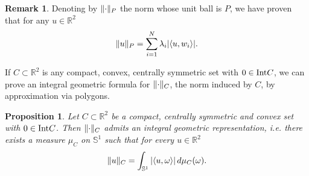 \documentclass{article}
\numberwithin{equation}{section}
\theoremstyle{plain}%
\newtheorem{proposition}[theorem]{Proposition}
\theoremstyle{definition}
\newtheorem{rem}[theorem]{Remark}
\theoremstyle{definition}
\newcommand{\rgrande}{\mathbb{R}}
\newcommand{\sfera}{\mathbb{S}}
\newcommand{\interno}{{\rm Int}}
\DeclarePairedDelimiter{\norma}{\lVert}{\rVert} %
\DeclarePairedDelimiter{\valass}{\lvert}{\rvert} %
\newcommand{\prodscal}[2]{\langle{#1} , {#2} \rangle}
\begin{document}
\begin{rem}
    Denoting by $\norma{\cdot}_P$ the norm whose unit ball is $P$, we have proven that for any $u \in \rgrande^2$
    $$
    \norma{u}_P
    =
    \sum_{i = 1}^{N} \lambda_i \valass{\prodscal{u}{w_i}}
    \text{.}
    $$
\end{rem}
If $C \subset \rgrande^2$ is any compact, convex, centrally symmetric set with $0\in\interno C$, we can prove an integral geometric formula for $\norma{\cdot}_C$, the norm induced by $C$, by approximation via polygons.
\begin{proposition}\label{propignelpiano}
Let $C \subset \rgrande^2$ be a compact, centrally symmetric and convex set with $0\in\interno C$. Then $\norma{\cdot}_C$ admits an integral geometric representation, i.e. there exists a measure $\mu_C$ on $\sfera^1$ such that for every $u \in \rgrande^2$
$$
\norma{u}_C
= \int_{\sfera^1} {\valass{\prodscal{u}{\omega}}} \,d \mu_C(\omega)
\text{.}
$$
\end{proposition}
\end{document}
